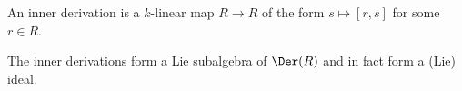 An inner derivation is a $k$-linear map $R\to R$ of the form $s\mapsto [r, s]$
for some $r \in R$.

The inner derivations form a Lie subalgebra of $\Der(R)$ and in fact form
a (Lie) ideal.
